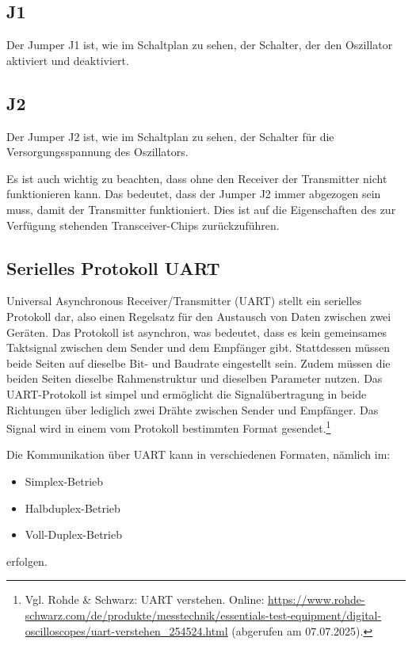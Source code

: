 \subsection{J1}
Der Jumper J1 ist, wie im Schaltplan zu sehen, der Schalter, der den Oszillator aktiviert und deaktiviert.
\subsection{J2}
Der Jumper J2 ist, wie im Schaltplan zu sehen, der Schalter für die Versorgungsspannung des Oszillators.

Es ist auch wichtig zu beachten, dass ohne den Receiver der Transmitter nicht funktionieren kann. Das bedeutet, dass der Jumper J2 immer abgezogen sein muss, damit der Transmitter funktioniert. Dies ist auf die Eigenschaften des zur Verfügung stehenden Transceiver-Chips zurückzuführen.

\subsection{Serielles Protokoll UART}
Universal Asynchronous Receiver/Transmitter (UART) stellt ein serielles Protokoll dar, also einen Regelsatz für den Austausch von Daten zwischen zwei Geräten. Das Protokoll ist asynchron, was bedeutet, dass es kein gemeinsames Taktsignal zwischen dem Sender und dem Empfänger gibt. Stattdessen müssen beide Seiten auf dieselbe Bit- und Baudrate eingestellt sein.
Zudem müssen die beiden Seiten dieselbe Rahmenstruktur und dieselben Parameter nutzen. Das UART-Protokoll ist simpel und ermöglicht die Signalübertragung in beide Richtungen über lediglich zwei Drähte zwischen Sender und Empfänger. Das Signal wird in einem vom Protokoll bestimmten Format gesendet.\footnote{Vgl. Rohde \& Schwarz: UART verstehen. Online: \url{https://www.rohde-schwarz.com/de/produkte/messtechnik/essentials-test-equipment/digital-oscilloscopes/uart-verstehen_254524.html} (abgerufen am 07.07.2025).} 

Die Kommunikation über UART kann in verschiedenen Formaten, nämlich im:
\begin{itemize}
    \item Simplex-Betrieb
    \item Halbduplex-Betrieb
    \item Voll-Duplex-Betrieb
\end{itemize}
erfolgen.

